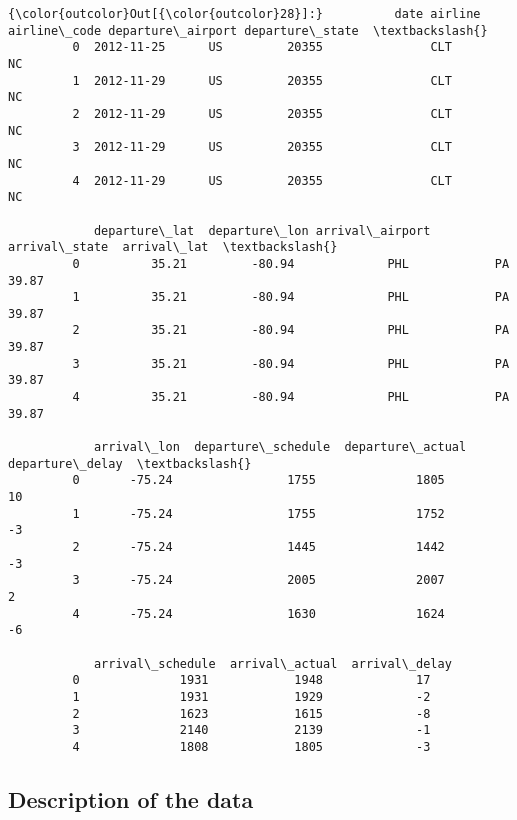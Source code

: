 \documentclass[11pt,landscape]{article}
\begin{document}
\begin{Verbatim}[commandchars=\\\{\}]
{\color{outcolor}Out[{\color{outcolor}28}]:}          date airline  airline\_code departure\_airport departure\_state  \textbackslash{}
         0  2012-11-25      US         20355               CLT              NC   
         1  2012-11-29      US         20355               CLT              NC   
         2  2012-11-29      US         20355               CLT              NC   
         3  2012-11-29      US         20355               CLT              NC   
         4  2012-11-29      US         20355               CLT              NC   
         
            departure\_lat  departure\_lon arrival\_airport arrival\_state  arrival\_lat  \textbackslash{}
         0          35.21         -80.94             PHL            PA        39.87   
         1          35.21         -80.94             PHL            PA        39.87   
         2          35.21         -80.94             PHL            PA        39.87   
         3          35.21         -80.94             PHL            PA        39.87   
         4          35.21         -80.94             PHL            PA        39.87   
         
            arrival\_lon  departure\_schedule  departure\_actual  departure\_delay  \textbackslash{}
         0       -75.24                1755              1805               10   
         1       -75.24                1755              1752               -3   
         2       -75.24                1445              1442               -3   
         3       -75.24                2005              2007                2   
         4       -75.24                1630              1624               -6   
         
            arrival\_schedule  arrival\_actual  arrival\_delay  
         0              1931            1948             17  
         1              1931            1929             -2  
         2              1623            1615             -8  
         3              2140            2139             -1  
         4              1808            1805             -3  
\end{Verbatim}
            
    \subsection{Description of the data}\label{description-of-the-data}
\end{document}
